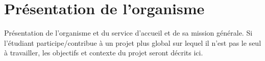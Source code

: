 \chapter{Présentation de l'organisme}
\label{sec:pres}

Présentation de l'organisme et du service d’accueil et de sa mission
générale. Si l’étudiant participe/contribue à un projet plus global sur lequel il n’est pas le seul à travailler, les objectifs et contexte du projet seront décrits ici. \\

\lipsum[1-2]
